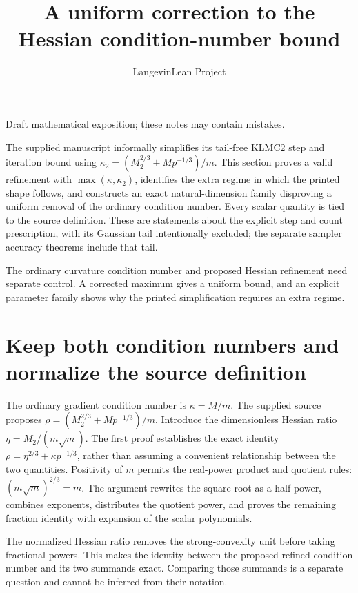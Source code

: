 \documentclass[11pt,a4paper]{article}
\title{\texorpdfstring{A uniform correction to the Hessian condition-number bound}{A uniform correction to the Hessian condition-number bound}}
\author{LangevinLean Project}
\date{}
\begin{document}
\maketitle
Draft mathematical exposition; these notes may contain mistakes.


The supplied manuscript informally simplifies its tail-free KLMC2 step and iteration bound using \(\kappa_2=(M_2^{2/3}+Mp^{-1/3})/m\). This section proves a valid refinement with \(\max(\kappa,\kappa_2)\), identifies the extra regime in which the printed shape follows, and constructs an exact natural-dimension family disproving a uniform removal of the ordinary condition number. Every scalar quantity is tied to the source definition. These are statements about the explicit step and count prescription, with its Gaussian tail intentionally excluded; the separate sampler accuracy theorems include that tail.



The ordinary curvature condition number and proposed Hessian refinement need separate control. A corrected maximum gives a uniform bound, and an explicit parameter family shows why the printed simplification requires an extra regime.


\section{\texorpdfstring{Keep both condition numbers and normalize the source definition}{Keep both condition numbers and normalize the source definition}}


The ordinary gradient condition number is \(\kappa=M/m\). The supplied source proposes \(\rho=(M_2^{2/3}+Mp^{-1/3})/m\). Introduce the dimensionless Hessian ratio \(\eta=M_2/(m\sqrt m)\). The first proof establishes the exact identity \(\rho=\eta^{2/3}+\kappa p^{-1/3}\), rather than assuming a convenient relationship between the two quantities. Positivity of \(m\) permits the real-power product and quotient rules: \((m\sqrt m)^{2/3}=m\). The argument rewrites the square root as a half power, combines exponents, distributes the quotient power, and proves the remaining fraction identity with expansion of the scalar polynomials.



The normalized Hessian ratio removes the strong-convexity unit before taking fractional powers. This makes the identity between the proposed refined condition number and its two summands exact. Comparing those summands is a separate question and cannot be inferred from their notation.
\end{document}
